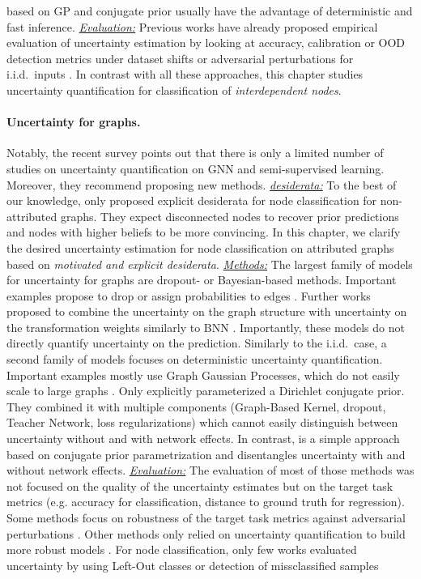 based on GP and conjugate prior usually have the advantage of deterministic and fast inference. \emph{\underline{Evaluation:}} Previous works have already proposed empirical evaluation of uncertainty estimation by looking at accuracy, calibration or OOD detection metrics under dataset shifts or adversarial perturbations for i.i.d.\ inputs \citep{dataset-shift, robustness-uncertainty-dirichlet}. In contrast with all these approaches, this chapter studies uncertainty quantification for classification of \emph{interdependent nodes}.

\paragraph{Uncertainty for graphs.} Notably, the recent survey \citep{review-uncertainty-dl} points out that there is only a limited number of studies on uncertainty quantification on GNN and semi-supervised learning. Moreover, they recommend proposing new methods. \emph{\underline{desiderata:}} To the best of our knowledge, only \citep{Eswaran2017} proposed explicit desiderata for node classification for non-attributed graphs. They expect disconnected nodes to recover prior predictions and nodes with higher beliefs to be more convincing. In this chapter, we clarify the desired uncertainty estimation for node classification on attributed graphs based on \emph{motivated and explicit desiderata}. \emph{\underline{Methods:}} The largest family of models for uncertainty for graphs are dropout- or Bayesian-based methods. Important examples propose to drop or assign probabilities to edges \citep{Rong2019, Chen2018, Hasanzadeh2020, Dallachiesa2014, Hu2017}. Further works proposed to combine the uncertainty on the graph structure with uncertainty on the transformation weights similarly to BNN \citep{Elinas2019, Zhang2019b, Pal2019a, Pal2019b}. Importantly, these models do not directly quantify uncertainty on the prediction. Similarly to the i.i.d.\ case, a second family of models focuses on deterministic uncertainty quantification. Important examples mostly use Graph Gaussian Processes, which do not easily scale to large graphs \citep{Ng2018, Zhi2020, Liu2020c, Borovitskiy2020}. Only \citep{Zhao2020} explicitly parameterized a Dirichlet conjugate prior. They combined it with multiple components (Graph-Based Kernel, dropout, Teacher Network, loss regularizations) which cannot easily distinguish between uncertainty without and with network effects. In contrast, \GPNacro{} is a simple approach based on conjugate prior parametrization and disentangles uncertainty with and without network effects. \emph{\underline{Evaluation:}} The evaluation of most of those methods was not focused on the quality of the uncertainty estimates but on the target task metrics (e.g. accuracy for classification, distance to ground truth for regression). Some methods focus on robustness of the target task metrics against adversarial perturbations \citep{GNNBook-ch8-gunnemann, zugner2018adversarial, zugner2019adversarial}. Other methods only relied on uncertainty quantification to build more robust models \citep{Zhu2019, Feng2020}. For node classification, only few works evaluated uncertainty by using Left-Out classes or detection of missclassified samples 